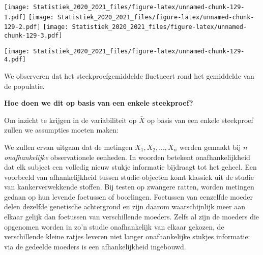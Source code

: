 \documentclass[
  12pt,dutch,coursenotes]{book}
\newenvironment{Shaded}{\begin{snugshade}}{\end{snugshade}}
\newcommand{\DataTypeTok}[1]{\textcolor[rgb]{0.13,0.29,0.53}{#1}}
\newcommand{\DecValTok}[1]{\textcolor[rgb]{0.00,0.00,0.81}{#1}}
\newcommand{\KeywordTok}[1]{\textcolor[rgb]{0.13,0.29,0.53}{\textbf{#1}}}
\newcommand{\NormalTok}[1]{#1}
\newcommand{\OperatorTok}[1]{\textcolor[rgb]{0.81,0.36,0.00}{\textbf{#1}}}
\newcommand{\StringTok}[1]{\textcolor[rgb]{0.31,0.60,0.02}{#1}}
\theoremstyle{definition}
\theoremstyle{definition}
\theoremstyle{definition}
\theoremstyle{remark}
\begin{document}
\texttt{[image: Statistiek\_2020\_2021\_files/figure-latex/unnamed-chunk-129-1.pdf]} \texttt{[image: Statistiek\_2020\_2021\_files/figure-latex/unnamed-chunk-129-2.pdf]} \texttt{[image: Statistiek\_2020\_2021\_files/figure-latex/unnamed-chunk-129-3.pdf]}

\begin{Shaded}
\end{Shaded}

\texttt{[image: Statistiek\_2020\_2021\_files/figure-latex/unnamed-chunk-129-4.pdf]}

We observeren dat het steekproefgemiddelde fluctueert rond het gemiddelde van de populatie.

\textbf{Hoe doen we dit op basis van een enkele steekproef?}

Om inzicht te krijgen in de variabiliteit op \(\bar X\) op basis van een enkele steekproef zullen we assumpties moeten maken:

We zullen ervan uitgaan dat de metingen \(X_1, X_2, ..., X_n\) werden gemaakt bij \(n\) \emph{onafhankelijke}
observationele eenheden. In woorden betekent onafhankelijkheid dat elk subject een volledig
nieuw stukje informatie bijdraagt tot het geheel. Een voorbeeld van
afhankelijkheid tussen studie-objecten komt klassiek uit de studie van
kankerverwekkende stoffen. Bij testen op zwangere ratten, worden metingen
gedaan op hun levende foetussen of boorlingen. Foetussen van eenzelfde
moeder delen dezelfde genetische achtergrond en zijn daarom waarschijnlijk
meer aan elkaar gelijk dan foetussen van verschillende moeders. Zelfs al
zijn de moeders die opgenomen worden in zo'n studie onafhankelijk van elkaar
gekozen, de verschillende kleine ratjes leveren niet langer onafhankelijke
stukjes informatie: via de gedeelde moeders is een afhankelijkheid
ingebouwd.
\end{document}
